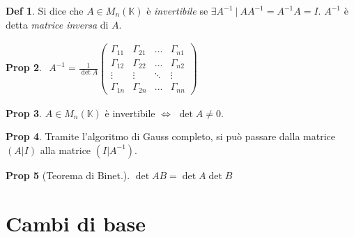 \documentclass[]{article}
\theoremstyle{definition}
\theoremstyle{definition}
\newtheorem{prop}{Prop}[subsection]
\theoremstyle{definition}
\newtheorem{dfn}[prop]{Def}
\begin{document}
\begin{dfn} Si dice che $A \in M_n ({\mathbb{K}})$ è \emph{invertibile} se $\exists A^{-1} \ | \ AA^{-1} = A^{-1}A = I$. $A^{-1}$ è detta \emph{matrice inversa} di $A$.

\end{dfn} \begin{prop} $ \begin{aligned}
A^{-1} = \frac{1}{\det A} 
\begin{pmatrix}
	\Gamma _{11}	& \Gamma _{21}	& ...		& \Gamma _{n1}	\\
	\Gamma _{12}	& \Gamma _{22}	& ...		& \Gamma _{n2}	\\
	\vdots			& \vdots		& \ddots	& \vdots		\\
	\Gamma _{1n}	& \Gamma _{2n}	& ...		& \Gamma _{nn}	
\end{pmatrix}
\end{aligned}
$

\end{prop} \begin{prop} $A \in M_n (\mathbb{K})$ è invertibile $\Leftrightarrow$ $\det A \neq 0$.

\end{prop} \begin{prop} Tramite l'algoritmo di Gauss completo, si può passare dalla matrice $(A|I)$ alla matrice $(I|A^{-1})$. 

\end{prop} \begin{prop}[Teorema di Binet.] $\det AB = \det A \det B$
\end{prop}

\section{Cambi di base}
\end{document}
